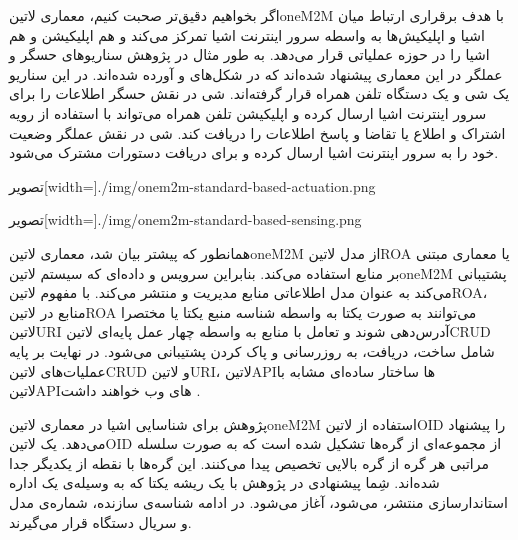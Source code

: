 اگر بخواهیم دقیق‌تر صحبت کنیم، معماری ‌لاتین{oneM2M} با هدف برقراری ارتباط میان اشیا و اپلیکیش‌ها به واسطه سرور اینترنت اشیا تمرکز می‌کند و هم اپلیکیشن و هم
اشیا را در حوزه عملیاتی قرار می‌دهد. به طور مثال در پژوهش  سناریوهای حسگر و عملگر در این معماری پیشنهاد شده‌اند که در شکل‌های
 و 
آورده شده‌اند. در این سناریو یک شی و یک دستگاه تلفن همراه قرار گرفته‌اند. شی در نقش حسگر اطلاعات را برای سرور اینترنت اشیا ارسال کرده و اپلیکیشن تلفن همراه می‌تواند
با استفاده از رویه اشتراک و اطلاع یا تقاضا و پاسخ اطلاعات را دریافت کند. شی در نقش عملگر وضعیت خود را به سرور اینترنت اشیا ارسال کرده و برای دریافت دستورات مشترک
می‌شود.

‌تصویر[width=\textwidth]{./img/onem2m-standard-based-actuation.png}

‌تصویر[width=\textwidth]{./img/onem2m-standard-based-sensing.png}

همانطور که پیشتر بیان شد، معماری ‌لاتین{oneM2M} از مدل ‌لاتین{ROA} یا معماری مبتنی بر منابع استفاده می‌کند.
بنابراین سرویس و داده‌ای که سیستم ‌لاتین{oneM2M} پشتیبانی می‌کند به عنوان مدل اطلاعاتی منابع مدیریت و منتشر می‌کند.
با مفهوم ‌لاتین{ROA}، منابع در ‌لاتین{ROA} می‌توانند به صورت یکتا به واسطه شناسه منبع یکتا یا مختصرا ‌لاتین{URI}
آدرس‌دهی شوند و تعامل با منابع به واسطه چهار عمل پایه‌ای ‌لاتین{CRUD} شامل ساخت، دریافت، به روزرسانی و پاک کردن پشتیبانی می‌شود.
در نهایت بر پایه عملیات‌های ‌لاتین{CRUD} و ‌لاتین{URI}، ‌لاتین{API}ها ساختار ساده‌ای مشابه با ‌لاتین{API}های وب خواهند داشت
.

پژوهش  برای شناسایی اشیا در معماری ‌لاتین{oneM2M} استفاده از ‌لاتین{OID} را پیشنهاد می‌دهد.
یک ‌لاتین{OID} از مجموعه‌ای از گره‌ها تشکیل شده است که به صورت سلسله مراتبی هر گره از گره بالایی تخصیص پیدا می‌کنند.
این گره‌ها با نقطه از یکدیگر جدا شده‌اند. شِما پیشنهادی در پژوهش  با یک ریشه یکتا که به وسیله‌ی یک اداره استاندارسازی منتشر،
می‌شود، آغاز می‌شود. در ادامه شناسه‌ی سازنده، شماره‌ی مدل و سریال دستگاه قرار می‌گیرند.
